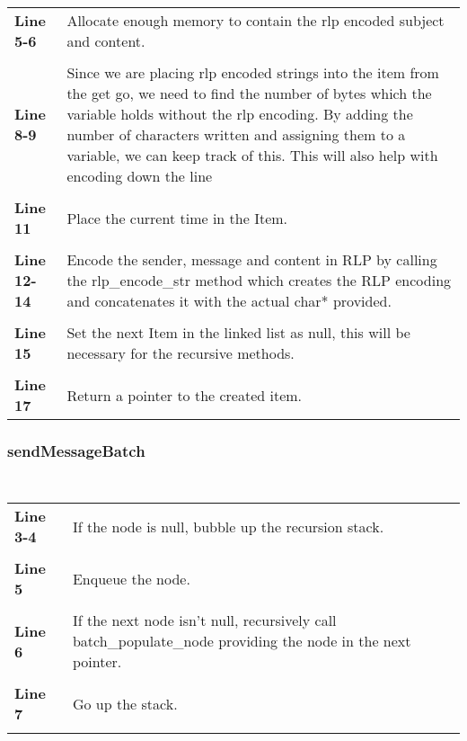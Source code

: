 \documentclass[a4paper, 12pt, titlepage]{article}
\newenvironment{code}{\captionsetup{type=listing}}{}
\newcommand{\sourcecode}[3]{
    \begin{code}
      \inputminted[linenos,numbersep=5pt,gobble=0,frame=lines,framesep=2mm,]{c}{#1}
        \caption{#2}
        \label{lst: #3}
    \end{code}
}
\begin{document}
\begin{onehalfspacing}
\begin{longtable}{l p{10cm}}
     \textbf{Line 5-6} & Allocate enough memory to contain the rlp encoded subject and content.\\ \\

     \textbf{Line 8-9} & Since we are placing rlp encoded strings into the item from the get go, we need to find the number of bytes which the variable holds without the rlp encoding. By adding the number of characters written and assigning them to a variable, we can keep track of this. This will also help with encoding down the line \\ \\

     \textbf{Line 11} & Place the current time in the Item.\\ \\

     \textbf{Line 12-14} & Encode the sender, message and content in RLP by calling the rlp\_encode\_str method which creates the RLP encoding and concatenates it with the actual char* provided. \\ \\

     \textbf{Line 15} & Set the next Item in the linked list as null, this will be necessary for the recursive methods.  \\ \\


     \textbf{Line 17} & Return a pointer to the created item.  \\

   \end{longtable}

   \clearpage

   \subsubsection{sendMessageBatch}

   \sourcecode{snippets/task2b/sendMessageBatch.c}{sendMessageBatch method implementation}{task2b_sendMessageBatch}


    \sourcecode{snippets/task2b/batchPopulateNode.c}{batchPopulateNode helper function}{batchPopulateNode}

    \begin{longtable}{l p{10cm}}
      \textbf{Line 3-4} & If the node is null, bubble up the recursion stack. \\ \\
      \textbf{Line 5} & Enqueue the node. \\ \\
      \textbf{Line 6} & If the next node isn't null, recursively call batch\_populate\_node providing the node in the next pointer. \\ \\
      \textbf{Line 7} & Go up the stack. \\ \\



\end{longtable}
\end{onehalfspacing}
\end{document}
